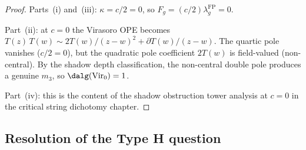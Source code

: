\documentclass[11pt]{article}
\begin{document}
\begin{proof}
Parts~(i) and~(iii): $\kappa = c/2 = 0$, so
$F_g = (c/2)\lambda_g^{\mathrm{FP}} = 0$.

Part~(ii): at $c = 0$ the Virasoro OPE becomes
$T(z)\,T(w) \sim 2T(w)/(z-w)^2 + \partial T(w)/(z-w)$.
The quartic pole vanishes ($c/2 = 0$), but the
quadratic pole coefficient $2T(w)$ is field-valued
(non-central).  By the shadow depth classification, the
non-central double pole produces a genuine $m_3$, so
$\dalg(\mathrm{Vir}_0) = 1$.

Part~(iv): this is the content of the shadow obstruction tower analysis
at $c = 0$ in the critical string dichotomy chapter.
\end{proof}

\subsection{Resolution of the Type H question}
\end{document}
